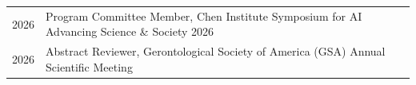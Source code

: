 \begin{longtable}[l]{@{}p{} p{}}

    2026 & Program Committee Member, Chen Institute Symposium for AI Advancing Science \& Society 2026 \\

    2026 & Abstract Reviewer, Gerontological Society of America (GSA) Annual Scientific Meeting

\end{longtable}
